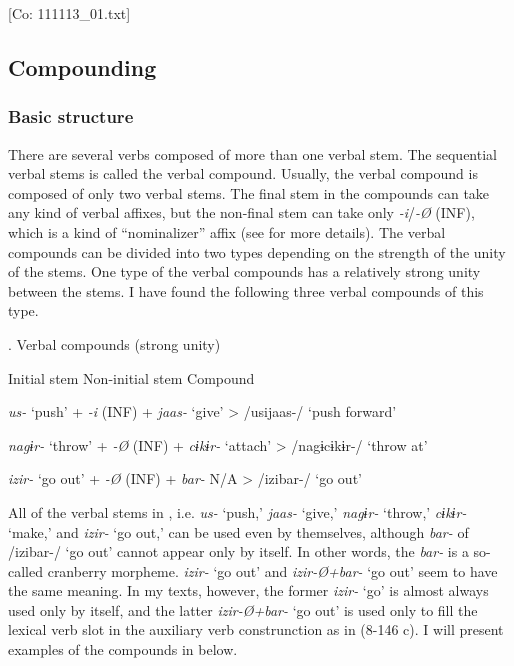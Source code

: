     [Co: 111113\_01.txt]

\subsection{Compounding}
\subsubsection{Basic structure}

There are several verbs composed of more than one verbal stem. The sequential verbal stems is called the verbal compound. Usually, the verbal compound is composed of only two verbal stems. The final stem in the compounds can take any kind of verbal affixes, but the non-final stem can take only \textit{{}-i}/\textit{{}-Ø} (INF), which is a kind of “nominalizer” affix (see  for more details). The verbal compounds can be divided into two types depending on the strength of the unity of the stems. One type of the verbal compounds has a relatively strong unity between the stems. I have found the following three verbal compounds of this type.

\begin{styleBeschriftung}
\textmd{}\textmd{. Verbal compounds (strong unity)}
\end{styleBeschriftung}

Initial stem    Non-initial stem    Compound

\textit{us-}  ‘push’  +  \textit{{}-i} (INF)  +  \textit{jaas-}  ‘give’  >  /usijaas-/  ‘push forward’

\textit{nagɨr-}  ‘throw’  +  \textit{{}-Ø} (INF)  +  \textit{cɨkɨr-}  ‘attach’  >  /nagɨcɨkɨr-/  ‘throw at’

\textit{izir-}  ‘go out’  +  \textit{{}-Ø} (INF)  +  \textit{bar-}  N/A  >  /izibar-/  ‘go out’

All of the verbal stems in , i.e. \textit{us-} ‘push,’ \textit{jaas-} ‘give,’ \textit{nagɨr-} ‘throw,’ \textit{cɨkɨr-} ‘make,’ and \textit{izir-} ‘go out,’ can be used even by themselves, although \textit{bar-} of /izibar-/ ‘go out’ cannot appear only by itself. In other words, the \textit{bar-} is a so-called cranberry morpheme. \textit{izir-} ‘go out’ and \textit{izir-Ø+bar-} ‘go out’ seem to have the same meaning. In my texts, however, the former \textit{izir-} ‘go’ is almost always used only by itself, and the latter \textit{izir-Ø+bar-} ‘go out’ is used only to fill the lexical verb slot in the auxiliary verb construnction as in (8-146 c). I will present examples of the compounds in  below.

